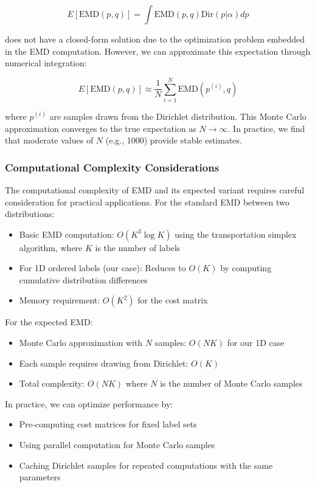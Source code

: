 \documentclass[journal]{IEEEtran}
\begin{document}
\begin{equation}
E[\text{EMD}(p,q)] = \int \text{EMD}(p,q) \text{Dir}(p|\alpha) dp
\end{equation}

does not have a closed-form solution due to the optimization problem embedded in the EMD computation. However, we can approximate this expectation through numerical integration:

\begin{equation}
E[\text{EMD}(p,q)] \approx \frac{1}{N} \sum_{i=1}^N \text{EMD}(p^{(i)},q)
\end{equation}

where $p^{(i)}$ are samples drawn from the Dirichlet distribution. This Monte Carlo approximation converges to the true expectation as $N \to \infty$. In practice, we find that moderate values of $N$ (e.g., 1000) provide stable estimates.

\subsubsection{Computational Complexity Considerations}
The computational complexity of EMD and its expected variant requires careful consideration for practical applications. For the standard EMD between two distributions:

\begin{itemize}
\item Basic EMD computation: $O(K^3 \log K)$ using the transportation simplex algorithm, where $K$ is the number of labels
\item For 1D ordered labels (our case): Reduces to $O(K)$ by computing cumulative distribution differences
\item Memory requirement: $O(K^2)$ for the cost matrix
\end{itemize}

For the expected EMD:
\begin{itemize}
\item Monte Carlo approximation with $N$ samples: $O(NK)$ for our 1D case
\item Each sample requires drawing from Dirichlet: $O(K)$
\item Total complexity: $O(NK)$ where $N$ is the number of Monte Carlo samples
\end{itemize}

In practice, we can optimize performance by:
\begin{itemize}
\item Pre-computing cost matrices for fixed label sets
\item Using parallel computation for Monte Carlo samples
\item Caching Dirichlet samples for repeated computations with the same parameters
\end{itemize}
\end{document}

